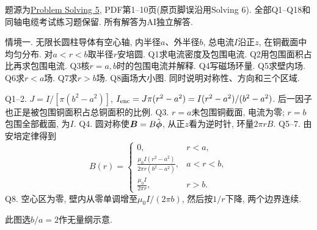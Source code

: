 题源为\href{https://ocw.mit.edu/courses/8-02-physics-ii-electricity-and-magnetism-spring-2007/resources/solving05/}{Problem Solving 5}, PDF第1--10页(原页脚误沿用Solving 6). 全部Q1--Q18和同轴电缆考试练习题保留. 所有解答为AI独立解答.

\begin{exercise}
情境一. 无限长圆柱导体有空心轴, 内半径$a$、外半径$b$, 总电流$I$沿正$z$, 在铜截面中均匀分布. 对$a<r<b$取半径$r$安培圆.
Q1求电流密度及包围电流.
Q2用包围面积占比再求包围电流.
Q3核$r=a,b$时的包围电流并解释.
Q4写磁场环量.
Q5求壁内场.
Q6求$r<a$场.
Q7求$r>b$场.
Q8画场大小图. 同时说明对称性、方向和三个区域.
\end{exercise}
\begin{solution}
Q1--2. $J=I/[\pi(b^2-a^2)]$, $I_{\rm enc}=J\pi(r^2-a^2)=I(r^2-a^2)/(b^2-a^2)$. 后一因子也正是被包围铜面积占总铜面积的比例.
Q3. $r=a$未包围铜截面, 电流为零; $r=b$包围全部截面, 为$I$.
Q4. 圆对称使$\boldsymbol{B}=B\hat{\boldsymbol{\phi}}$, 从正$z$看为逆时针, 环量$2\pi rB$.
Q5--7. 由安培定律得到
\[
B(r)=\begin{cases}0,&r<a,\\
\displaystyle\frac{\mu_0I(r^2-a^2)}{2\pi r(b^2-a^2)},&a<r<b,\\
\displaystyle\frac{\mu_0I}{2\pi r},&r>b.
\end{cases}
\]
Q8. 空心区为零, 壁内从零单调增至$\mu_0I/(2\pi b)$, 然后按$1/r$下降, 两个边界连续.
\begin{center}\end{center}
此图选$b/a=2$作无量纲示意.
\end{solution}

